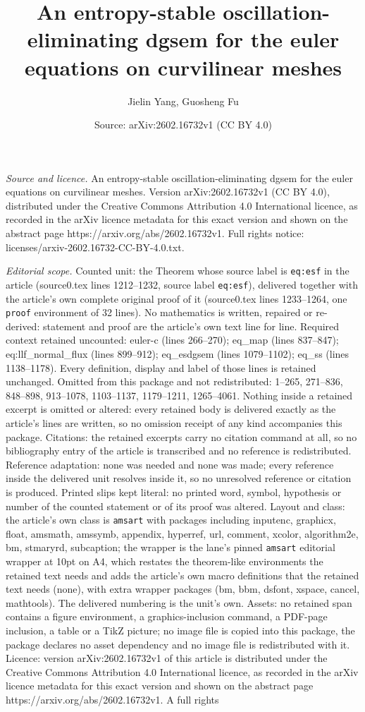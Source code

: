 \documentclass[10pt,a4paper]{amsart}
\title[An entropy-stable oscillation-eliminating dgsem for the eule]{An entropy-stable oscillation-eliminating dgsem for the euler equations on curvilinear meshes}
\author{Jielin Yang, Guosheng Fu}
\date{Source: arXiv:2602.16732v1 (CC BY 4.0)}
\begin{document}
\maketitle

\noindent\emph{Source and licence.} An entropy-stable oscillation-eliminating dgsem for the euler equations on curvilinear meshes. Version arXiv:2602.16732v1 (CC BY 4.0), distributed under the Creative Commons Attribution 4.0 International licence, as recorded in the arXiv licence metadata for this exact version and shown on the abstract page https://arxiv.org/abs/2602.16732v1. Full rights notice: licenses/arxiv-2602.16732-CC-BY-4.0.txt.\par\smallskip

\noindent\textit{Editorial scope.} Counted unit: the Theorem whose source label is \texttt{eq:esf} in the article (source0.tex lines 1212--1232, source label \texttt{eq:esf}), delivered together with the article's own complete original proof of it (source0.tex lines 1233--1264, one \texttt{proof} environment of 32 lines). No mathematics is written, repaired or re-derived: statement and proof are the article's own text line for line. Required context retained uncounted: euler-c (lines 266--270); eq\_map (lines 837--847); eq:llf\_normal\_flux (lines 899--912); eq\_esdgsem (lines 1079--1102); eq\_ss (lines 1138--1178). Every definition, display and label of those lines is retained unchanged. Omitted from this package and not redistributed: 1--265, 271--836, 848--898, 913--1078, 1103--1137, 1179--1211, 1265--4061. Nothing inside a retained excerpt is omitted or altered: every retained body is delivered exactly as the article's lines are written, so no omission receipt of any kind accompanies this package. Citations: the retained excerpts carry no citation command at all, so no bibliography entry of the article is transcribed and no reference is redistributed. Reference adaptation: none was needed and none was made; every reference inside the delivered unit resolves inside it, so no unresolved reference or citation is produced. Printed slips kept literal: no printed word, symbol, hypothesis or number of the counted statement or of its proof was altered. Layout and class: the article's own class is \texttt{amsart} with packages including inputenc, graphicx, float, amsmath, amssymb, appendix, hyperref, url, comment, xcolor, algorithm2e, bm, stmaryrd, subcaption; the wrapper is the lane's pinned \texttt{amsart} editorial wrapper at 10pt on A4, which restates the theorem-like environments the retained text needs and adds the article's own macro definitions that the retained text needs (none), with extra wrapper packages (bm, bbm, dsfont, xspace, cancel, mathtools). The delivered numbering is the unit's own. Assets: no retained span contains a figure environment, a graphics-inclusion command, a PDF-page inclusion, a table or a TikZ picture; no image file is copied into this package, the package declares no asset dependency and no image file is redistributed with it. Licence: version arXiv:2602.16732v1 of this article is distributed under the Creative Commons Attribution 4.0 International licence, as recorded in the arXiv licence metadata for this exact version and shown on the abstract page https://arxiv.org/abs/2602.16732v1. A full rights 
\end{document}
